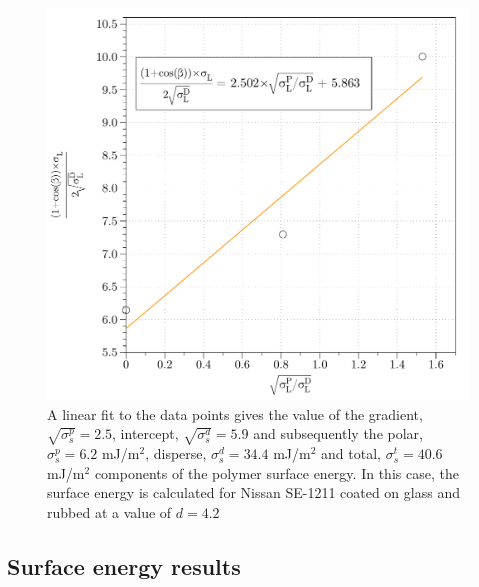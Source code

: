 \begin{figure}
\begin{center}
\includegraphics{Figures/Pretilt/owrk}
\end{center}
\caption[Calculation of surface energies]{\label{fig:owrk}{A linear fit to the data points gives the value of the gradient, $\sqrt{\sigma_s^p}=2.5$, intercept, $\sqrt{\sigma_s^d}=5.9$ and subsequently the polar, $\sigma_s^p=6.2$ mJ/m$^2$, disperse, $\sigma_s^d=34.4$ mJ/m$^2$ and total, $\sigma_s^t=40.6$ mJ/m$^2$ components of the polymer surface energy. In this case, the surface energy is calculated for Nissan SE-1211 coated on glass and rubbed at a value of $d=4.2$}}
\end{figure}

\subsection{Surface energy results}

